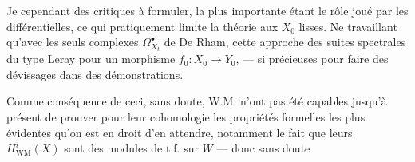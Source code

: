 Je  cependant des  critiques à formuler, la plus importante étant le rôle joué par les différentielles, ce qui pratiquement limite la théorie aux $X_0$ lisses.
Ne  travaillant qu'avec les seuls complexes $\Omega^\bullet_{X_t}$ de  De Rham,  cette approche   des suites spectrales du  type Leray pour un morphisme $f_0:X_0\to Y_0$, --- si précieuses pour faire des dévissages dans des démonstrations.

Comme conséquence de  ceci, sans doute, W.M. n'ont pas été capables jusqu'à présent de prouver pour leur cohomologie les  propriétés formelles les plus évidentes qu'on est en droit d'en attendre, notamment le fait que leurs $H^i_{\mathrm{WM}}(X)$ sont des modules de t.f. sur $W$ --- donc sans doute


